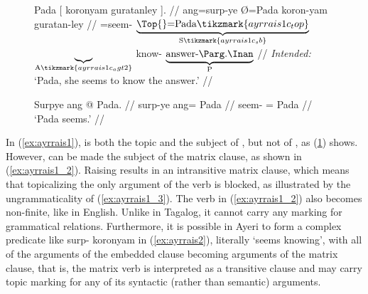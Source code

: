 \begin{figure}
\a\label{ex:ayrrais1_3}\ljudge*%
\begingl[aboveglcskip=1.5em, aboveglftskip=1.75em]
	 Pada \textup{[} {} koronyam guratanley 
		\textup{]}. //
	\glb ang=surp-ye Ø=Pada {} {} koron-yam guratan-ley {} //
	\glc \Aarg{}=seem-\TsgF{}%
		$\underbrace{\text{\Top{}=Pada}%
			\tikzmark{ayrrais1c_top}%
		}_{\text{S}%
			\tikzmark{ayrrais1c_sb}%
		}$
		{}
		$\underbrace{}_{\text{A}%
			\tikzmark{ayrrais1c_agt2}%
		}$
		know-\Ptcp{}
		$\underbrace{\text{answer-\PargI{}}}_{\text{P}}$
		{}
		//
	\glft \textit{Intended:} `Pada, she seems to know the answer.' //
\endgl
{}

\a\label{ex:ayrrais1_4}\ljudge*\begingl
	\gla Surpye ang @ Pada. //
	\glb surp-ye ang= Pada //
	\glc seem-\TsgF{} \Aarg{}= Pada //
	\glft `Pada seems.' //
\endgl

\xe
\end{figure}

In (\ref{ex:ayrrais1}),  is both the topic and the subject of
, but not of , as
(\ref{ex:ayrrais1_4}) shows. However,  can be made the subject
of the matrix clause, as shown in (\ref{ex:ayrrais1_2}). Raising results in an
intransitive matrix clause, which means that topicalizing the only argument of
the verb is blocked, as illustrated by the ungrammaticality of
(\ref{ex:ayrrais1_3}). The verb in (\ref{ex:ayrrais1_2}) also becomes
non-finite, like in English. Unlike in Tagalog, it cannot carry any marking for
grammatical relations. Furthermore, it is possible in Ayeri to form a complex
predicate like  {surp- koronyam} in (\ref{ex:ayrrais2}),
literally `seems knowing', with all of the arguments of the embedded clause
becoming arguments of the matrix clause, that is, the matrix verb is
interpreted as a transitive clause and may carry topic marking for any of its
syntactic (rather than semantic) arguments.


